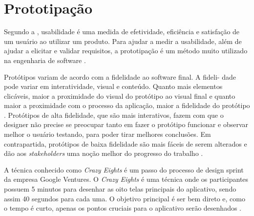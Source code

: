 \section{Prototipação}

Segundo a , usabilidade é uma medida de efetividade, eficiência e satisfação de um usuário ao utilizar um produto. Para ajudar a medir a usabilidade, além de ajudar a elicitar e validar requisitos, a prototipação é um método muito utilizado na engenharia de software \cite{sommerville}.

Protótipos variam de acordo com a fidelidade ao software final. A fideli- dade pode variar em interatividade, visual e conteúdo. Quanto mais elementos clicáveis, maior a proximidade do visual do protótipo ao visual final e quanto maior a proximidade com o processo da aplicação, maior a fidelidade do protótipo \cite{nielsen}. Protótipos de alta fidelidade, que são mais interativos, fazem com que o designer não precise se preocupar tanto em fazer o protótipo funcionar e observar melhor o usuário testando, para poder tirar melhores conclusões. Em contrapartida, protótipos de baixa fidelidade são mais fáceis de serem alterados e dão aos \textit{stakeholders} uma noção melhor do progresso do trabalho \cite{nielsen}.

A técnica conhecido como \textit{Crazy Eights} é um passo do processo de design sprint da empresa Google Ventures. O \textit{Crazy Eights} é uma técnica onde os participantes possuem 5 minutos para desenhar as oito telas principais do aplicativo, sendo assim 40 segundos para cada uma. O objetivo principal é ser bem direto e, como o tempo é curto, apenas os pontos cruciais para o aplicativo serão desenhados \cite{knapp}.
